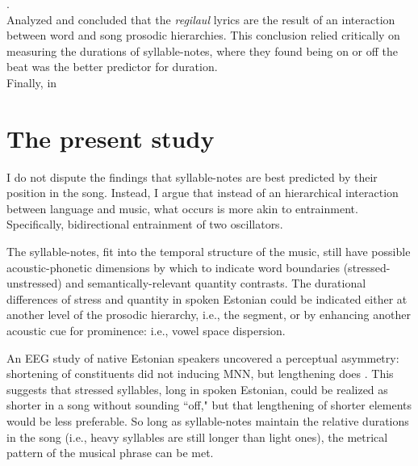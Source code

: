 \citep{rossTradeoffQuantityStress1996}. \\

\citep{rossTimingEstonianFolk1998} Analyzed and concluded that the {\it regilaul} lyrics are the result of an interaction between word and song prosodic hierarchies. This conclusion relied critically on measuring the durations of syllable-notes, where they found being on or off the beat was the better predictor for duration. \\


Finally, in %

\section{The present study}

I do not dispute the findings that syllable-notes are best predicted by their position in the song. Instead, I argue that instead of an hierarchical interaction between language and music, what occurs is more akin to entrainment. Specifically, bidirectional entrainment of two oscillators. 

The syllable-notes, fit into the temporal structure of the music, still have possible acoustic-phonetic dimensions by which to indicate word boundaries (stressed-unstressed) and semantically-relevant quantity contrasts.  The durational differences of stress and quantity in spoken Estonian could be indicated either at another level of the prosodic hierarchy, i.e.,  the segment, or by enhancing another acoustic cue for prominence: i.e.,  vowel space dispersion. 


An EEG study of native Estonian speakers uncovered a perceptual asymmetry: shortening of constituents did not inducing MNN, but lengthening does \citep{eestiMNNasymmetry}. This suggests that stressed syllables, long in spoken Estonian, could be realized as shorter in a song without sounding ``off," but that lengthening of shorter elements would be less preferable. So long as syllable-notes maintain the relative durations in the song (i.e., heavy syllables are still longer than light ones), the metrical pattern of the musical phrase can be met. 

